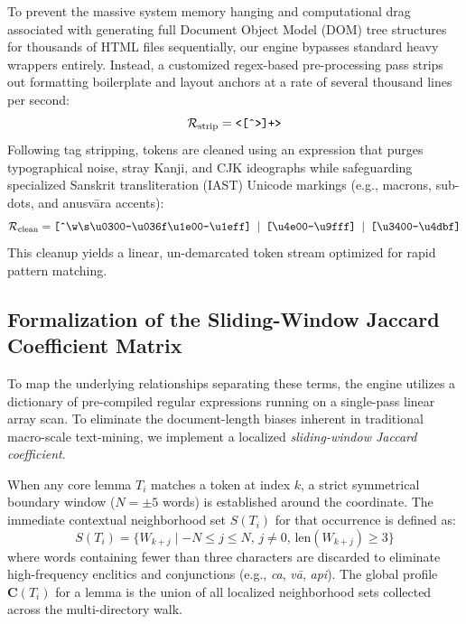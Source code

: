 \documentclass[11pt,twoside,letterpaper]{article}
\begin{document}
To prevent the massive system memory hanging and computational drag associated with generating full Document Object Model (DOM) tree structures for thousands of HTML files sequentially, our engine bypasses standard heavy wrappers entirely. Instead, a customized regex-based pre-processing pass strips out formatting boilerplate and layout anchors at a rate of several thousand lines per second:
\begin{equation}
\mathcal{R}_{\text{strip}} = \text{\texttt{<[\^{}>]+>}}
\end{equation}
Following tag stripping, tokens are cleaned using an expression that purges typographical noise, stray Kanji, and CJK ideographs while safeguarding specialized Sanskrit transliteration (IAST) Unicode markings (e.g., macrons, sub-dots, and anusvāra accents):
\begin{equation}
\mathcal{R}_{\text{clean}} = \text{\texttt{[\^{}\textbackslash w\textbackslash s\textbackslash u0300-\textbackslash u036f\textbackslash u1e00-\textbackslash u1eff] \(\vert\) [\textbackslash u4e00-\textbackslash u9fff] \(\vert\) [\textbackslash u3400-\textbackslash u4dbf]}}
\end{equation}
This cleanup yields a linear, un-demarcated token stream optimized for rapid pattern matching.

\subsection{Formalization of the Sliding-Window Jaccard Coefficient Matrix}
To map the underlying relationships separating these terms, the engine utilizes a dictionary of pre-compiled regular expressions running on a single-pass linear array scan. To eliminate the document-length biases inherent in traditional macro-scale text-mining, we implement a localized \textit{sliding-window Jaccard coefficient}. 

When any core lemma $T_i$ matches a token at index $k$, a strict symmetrical boundary window ($N = \pm 5$ words) is established around the coordinate. The immediate contextual neighborhood set $S(T_i)$ for that occurrence is defined as:
\begin{equation}
S(T_i) = \{ W_{k+j} \mid -N \le j \le N, \, j \neq 0, \, \text{len}(W_{k+j}) \ge 3 \}
\end{equation}
where words containing fewer than three characters are discarded to eliminate high-frequency enclitics and conjunctions (e.g., \textit{ca}, \textit{vā}, \textit{api}). The global profile $\mathbf{C}(T_i)$ for a lemma is the union of all localized neighborhood sets collected across the multi-directory walk.
\end{document}
